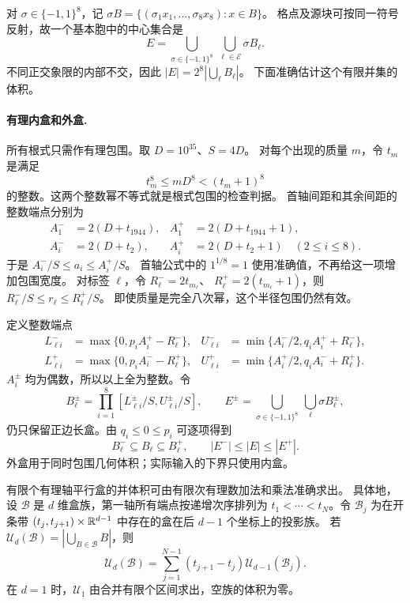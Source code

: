 对 $\sigma\in\{-1,1\}^8$，记
$\sigma B=\{(\sigma_1x_1,\ldots,\sigma_8x_8):x\in B\}$。
格点及源块可按同一符号反射，故一个基本胞中的中心集合是
\[
 E=\bigcup_{\sigma\in\{-1,1\}^8}\ \bigcup_{\ell\in\mathcal E}\sigma B_\ell.
\]
不同正交象限的内部不交，因此
$|E|=2^8|\bigcup_\ell B_\ell|$。
下面准确估计这个有限并集的体积。

\paragraph{有理内盒和外盒.}
所有根式只需作有理包围。取 $D=10^{35}$、$S=4D$。
对每个出现的质量 $m$，令 $t_m$ 是满足
\begin{equation}\label{lo:root-certificate}
 t_m^8\le mD^8<(t_m+1)^8
\end{equation}
的整数。这两个整数幂不等式就是根式包围的检查判据。
首轴间距和其余间距的整数端点分别为
\begin{align*}
 A_1^-&=2(D+t_{1944}),& A_1^+&=2(D+t_{1944}+1),\\
 A_i^-&=2(D+t_2),& A_i^+&=2(D+t_2+1)\quad(2\le i\le8).
\end{align*}
于是 $A_i^-/S\le a_i\le A_i^+/S$。
首轴公式中的 $1^{1/8}=1$ 使用准确值，不再给这一项增加包围宽度。
对标签 $\ell$，令 $R_\ell^-=2t_{m_\ell}$、
$R_\ell^+=2(t_{m_\ell}+1)$，则
$R_\ell^-/S\le r_\ell\le R_\ell^+/S$。
即使质量是完全八次幂，这个半径包围仍然有效。

定义整数端点
\begin{align}
 L_{\ell i}^-&=\max\{0,p_iA_i^+-R_\ell^-\},&
 U_{\ell i}^-&=\min\{A_i^-/2,q_iA_i^++R_\ell^-\},\label{lo:inner-endpoints}\\
 L_{\ell i}^+&=\max\{0,p_iA_i^--R_\ell^+\},&
 U_{\ell i}^+&=\min\{A_i^+/2,q_iA_i^-+R_\ell^+\}.
 \label{lo:outer-endpoints}
\end{align}
$A_i^\pm$ 均为偶数，所以以上全为整数。令
\[
 B_\ell^\pm=\prod_{i=1}^8[L_{\ell i}^\pm/S,U_{\ell i}^\pm/S],
 \qquad
 E^\pm=\bigcup_{\sigma\in\{-1,1\}^8}\ \bigcup_\ell\sigma B_\ell^\pm,
\]
仍只保留正边长盒。由 $q_i\le0\le p_i$ 可逐项得到
\begin{equation}\label{lo:box-sandwich}
 B_\ell^-\subseteq B_\ell\subseteq B_\ell^+,
 \qquad |E^-|\le |E|\le |E^+|.
\end{equation}
外盒用于同时包围几何体积；实际输入的下界只使用内盒。

\begin{lemma}\label{lo:union-recursion}
有限个有理轴平行盒的并体积可由有限次有理数加法和乘法准确求出。
具体地，设 $\mathcal B$ 是 $d$ 维盒族，第一轴所有端点按递增次序排列为
$t_1<\cdots<t_N$。令 $\mathcal B_j$ 为在开条带
$(t_j,t_{j+1})\times\mathbb{R}^{d-1}$ 中存在的盒在后 $d-1$ 个坐标上的投影族。
若 $\mathcal U_d(\mathcal B)=|\bigcup_{B\in\mathcal B}B|$，则
\begin{equation}\label{lo:sweep-recursion}
 \mathcal U_d(\mathcal B)=
 \sum_{j=1}^{N-1}(t_{j+1}-t_j)\mathcal U_{d-1}(\mathcal B_j).
\end{equation}
在 $d=1$ 时，$\mathcal U_1$ 由合并有限个区间求出，空族的体积为零。
\end{lemma}

